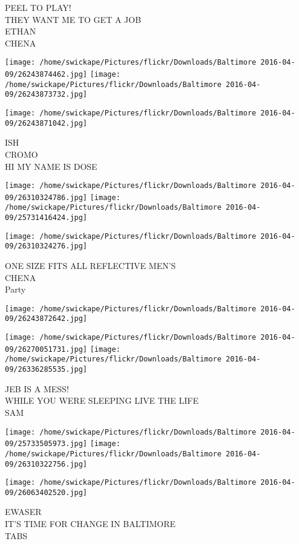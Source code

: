 \documentclass[10pt,letterpaper]{article}
\begin{document}
PEEL TO PLAY!\\
THEY WANT ME TO GET A JOB\\
ETHAN\\
CHENA
\pagebreak

\texttt{[image: /home/swickape/Pictures/flickr/Downloads/Baltimore 2016-04-09/26243874462.jpg]}
\texttt{[image: /home/swickape/Pictures/flickr/Downloads/Baltimore 2016-04-09/26243873732.jpg]}

\vspace{0.25in}
\texttt{[image: /home/swickape/Pictures/flickr/Downloads/Baltimore 2016-04-09/26243871042.jpg]}

ISH\\
CROMO\\
HI MY NAME IS DOSE
\pagebreak

\texttt{[image: /home/swickape/Pictures/flickr/Downloads/Baltimore 2016-04-09/26310324786.jpg]}
\texttt{[image: /home/swickape/Pictures/flickr/Downloads/Baltimore 2016-04-09/25731416424.jpg]}

\vspace{0.25in}
\texttt{[image: /home/swickape/Pictures/flickr/Downloads/Baltimore 2016-04-09/26310324276.jpg]}

ONE SIZE FITS ALL REFLECTIVE MEN'S\\
CHENA\\
Party
\pagebreak

\texttt{[image: /home/swickape/Pictures/flickr/Downloads/Baltimore 2016-04-09/26243872642.jpg]}

\vspace{0.25in}
\texttt{[image: /home/swickape/Pictures/flickr/Downloads/Baltimore 2016-04-09/26270051731.jpg]}
\texttt{[image: /home/swickape/Pictures/flickr/Downloads/Baltimore 2016-04-09/26336285535.jpg]}

JEB IS A MESS!\\
WHILE YOU WERE SLEEPING LIVE THE LIFE\\
SAM
\pagebreak

\texttt{[image: /home/swickape/Pictures/flickr/Downloads/Baltimore 2016-04-09/25733505973.jpg]}
\texttt{[image: /home/swickape/Pictures/flickr/Downloads/Baltimore 2016-04-09/26310322756.jpg]}

\texttt{[image: /home/swickape/Pictures/flickr/Downloads/Baltimore 2016-04-09/26063402520.jpg]}

EWASER\\
IT'S TIME FOR CHANGE IN BALTIMORE\\
TABS
\pagebreak
\end{document}
